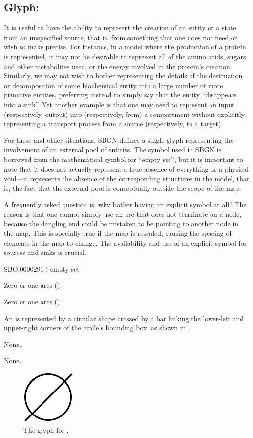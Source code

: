 \subsection{Glyph: }
\label{sec:emptySet}

It is useful to have the ability to represent the creation of an entity or a state from an unspecified source, that is, from something that one does not need or wish to make precise.  For instance, in a model where the production of a protein is represented, it may not be desirable to represent all of the amino acids, sugars and other metabolites used, or the energy involved in the protein's creation.
Similarly, we may not wish to bother representing the details of the destruction or decomposition of some biochemical entity into a large number of more primitive entities, preferring instead to simply say that the entity ``disappears into a sink''.
Yet another example is that one may need to represent an input (respectively, output) into (respectively, from) a compartment without explicitly representing a transport process from a source (respectively, to a target).

For these and other situations, SBGN defines a single glyph representing the involvement of an external pool of entities.
The symbol used in SBGN is borrowed from the mathematical symbol for ``empty set'', but it is important to note that it does not actually represent a true absence of everything or a physical void---it represents the absence of the corresponding structures in the model, that is, the fact that the external pool is conceptually outside the scope of the map.

A frequently asked question is, why bother having an explicit symbol at all?
The reason is that one cannot simply use an arc that does not terminate on a node, because the dangling end could be mistaken to be pointing to another node in the map.  This is specially true if the map is rescaled, causing the spacing of elements in the map to change.
The availability and use of an explicit symbol for sources and sinks is crucial.

\begin{glyphDescription}

\glyphSboTerm
SBO:0000291 ! empty set

\glyphIncoming
Zero or one  arcs ().

\glyphOutgoing
Zero or one  arcs ().

\glyphContainer
An  is represented by a circular shape crossed by a bar linking the lower-left and upper-right corners of the circle's bounding box, as shown in .

\glyphLabel
None.

\glyphAux
None.

\end{glyphDescription}

\begin{figure}[H]
  \centering
  \includegraphics{images/build/empty_set.pdf}
  \caption{The \PD glyph for .}
  \label{fig:emptySet}
\end{figure}
